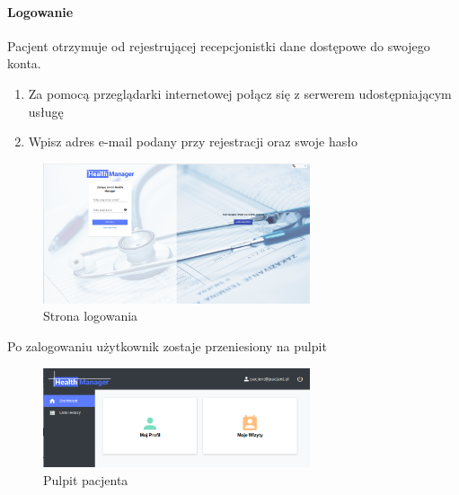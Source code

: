\documentclass[polish,12pt]{aghthesis}
\begin{document}
    \paragraph{Logowanie}{
    Pacjent otrzymuje od rejestrującej recepcjonistki dane dostępowe do swojego konta. \\
    \begin{enumerate}
        \item Za pomocą przeglądarki internetowej połącz się z serwerem udostępniającym usługę
        \item Wpisz adres e-mail podany przy rejestracji oraz swoje hasło
    \end{enumerate}
    \begin{figure}[H]
        \includegraphics[width=0.7\textwidth]{gui-loginpage}
        \caption{Strona logowania}
    \end{figure}
    Po zalogowaniu użytkownik zostaje przeniesiony na pulpit
    \begin{figure}[H]
        \includegraphics[width=0.7\textwidth]{gui-patient-dashboard}
        \caption{Pulpit pacjenta}
    \end{figure}
        
    }
\end{document}
